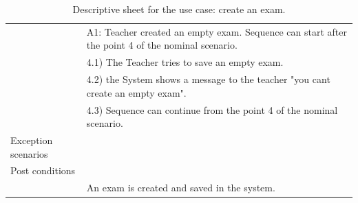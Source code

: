 \documentclass[]{uc2pfecaneva}
\begin{document}
\begin{table}[h]
\begin{tabularx}{\textwidth}{|l|X|}
		                      & A1: Teacher created an empty exam. Sequence can start after the point 4 of the nominal scenario.            \\
		                      & \hspace{4mm}4.1) The Teacher tries to save an empty exam.                                                    \\
		                      & \hspace{4mm}4.2) the System shows a message to the teacher "you cant create an empty exam".                  \\
		                      & \hspace{4mm}4.3) Sequence can continue from the point 4 of the nominal scenario.                             \\ \hline
		Exception scenarios   &                                                                                                             \\ \hline
		Post conditions       &                                                                                                             \\
		                      & An exam is created and saved in the system.                                                                 \\ \hline
	\end{tabularx}
	\caption{Descriptive sheet for the use case: create an exam.}
	\label{table:3}
\end{table}
\clearpage
\end{document}
